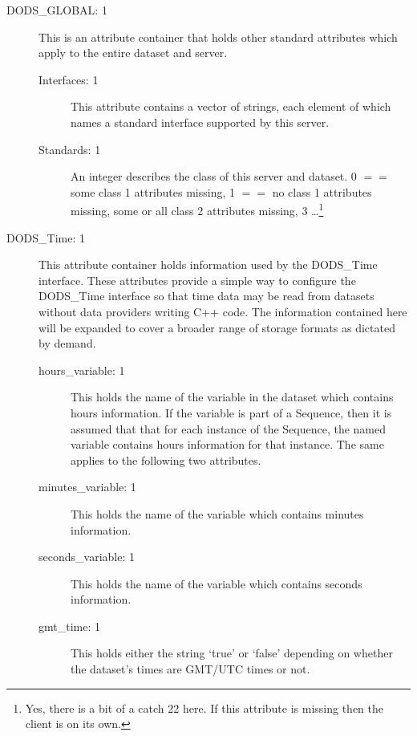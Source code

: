 \documentclass[12pt]{article}
\begin{document}
\begin{description}

\item [DODS\_GLOBAL: 1] This is an attribute container that holds other
  standard attributes which apply to the entire dataset and server.

  \begin{description}

  \item [Interfaces: 1] This attribute contains a vector of strings, each
    element of which names a standard interface supported by this server.
  \item [Standards: 1] An integer describes the class of this server
    and dataset. 0 $==$ some class 1 attributes missing, 1 $==$ no class 1
    attributes missing, some or all class 2 attributes missing, 3
    \ldots\footnote{Yes, there is a bit of a catch 22 here. If this attribute
      is missing then the client is on its own.}

  \end{description}

\item [DODS\_Time: 1] This attribute container holds information used by the
  DODS\_Time interface. These attributes provide a simple way to configure
  the DODS\_Time interface so that time data may be read from datasets
  without data providers writing C++ code. The information contained here will
  be expanded to cover a broader range of storage formats as dictated by
  demand. 
  
  \begin{description}
    
  \item [hours\_variable: 1] This holds the name of the variable in the
      dataset which contains hours information. If the variable is part of a
      Sequence, then it is assumed that that for each instance of the
      Sequence, the named variable contains hours information for that
      instance. The same applies to the following two attributes. 

    \item [minutes\_variable: 1] This holds the name of the variable which
      contains minutes information.

    \item [seconds\_variable: 1] This holds the name of the variable
      which contains seconds information.
      
    \item [gmt\_time: 1] This holds either the string `true' or `false'
      depending on whether the dataset's times are GMT/UTC times or not.


\end{description}
\end{description}
\end{document}

